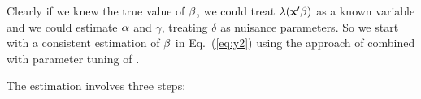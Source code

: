 \documentclass[11pt]{article}
\begin{document}

Clearly if we knew the true value of $\mathbf{\beta}$, we could treat $\lambda(\mathbf{x}'\mathbf{\beta})$
as a known variable and we could estimate $\mathbf{\alpha}$ and $\gamma$, treating $\delta$ as nuisance parameters. So we start with a consistent estimation of $\mathbf{\beta}$ in Eq.~(\ref{eq:y2}) using the approach of \cite{bellonichernozhukovwei2016} combined with parameter tuning of \cite{drukker/liu:22}.


The estimation involves three steps:

\end{document}
